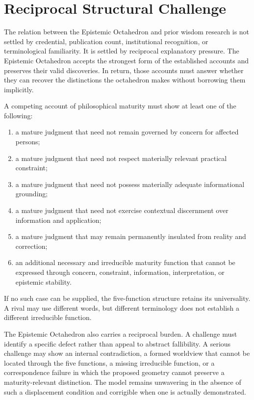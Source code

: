 \documentclass[11pt]{article}
\begin{document}
\section{Reciprocal Structural Challenge}

The relation between the Epistemic Octahedron and prior wisdom research is not settled by credential, publication count, institutional recognition, or terminological familiarity. It is settled by reciprocal explanatory pressure. The Epistemic Octahedron accepts the strongest form of the established accounts and preserves their valid discoveries. In return, those accounts must answer whether they can recover the distinctions the octahedron makes without borrowing them implicitly.

A competing account of philosophical maturity must show at least one of the following:
\begin{enumerate}[label=\arabic*.]
    \item a mature judgment that need not remain governed by concern for affected persons;
    \item a mature judgment that need not respect materially relevant practical constraint;
    \item a mature judgment that need not possess materially adequate informational grounding;
    \item a mature judgment that need not exercise contextual discernment over information and application;
    \item a mature judgment that may remain permanently insulated from reality and correction;
    \item an additional necessary and irreducible maturity function that cannot be expressed through concern, constraint, information, interpretation, or epistemic stability.
\end{enumerate}

If no such case can be supplied, the five-function structure retains its universality. A rival may use different words, but different terminology does not establish a different irreducible function.

The Epistemic Octahedron also carries a reciprocal burden. A challenge must identify a specific defect rather than appeal to abstract fallibility. A serious challenge may show an internal contradiction, a formed worldview that cannot be located through the five functions, a missing irreducible function, or a correspondence failure in which the proposed geometry cannot preserve a maturity-relevant distinction. The model remains unwavering in the absence of such a displacement condition and corrigible when one is actually demonstrated.
\end{document}
